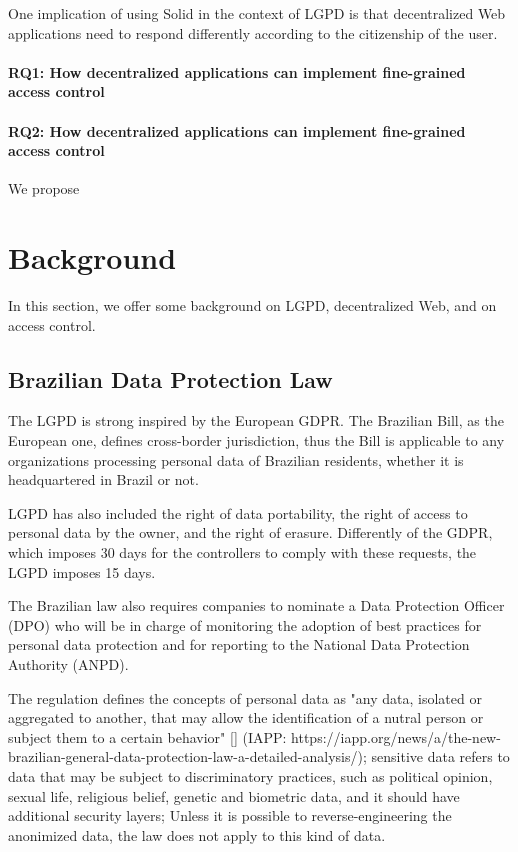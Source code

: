 \documentclass[sigconf]{acmart}
\begin{document}
One implication of using Solid in the context of LGPD is that decentralized Web applications need to respond differently according to the citizenship of the user.

\paragraph{RQ1: How decentralized applications can implement fine-grained access control}

\paragraph{RQ2: How decentralized applications can implement fine-grained access control}

We propose



\section{Background}
In this section, we offer some background on LGPD, decentralized Web, and on access control.

\subsection{Brazilian Data Protection Law}
The LGPD is strong inspired by the European GDPR. The Brazilian Bill, as the European one, defines cross-border jurisdiction, thus the Bill is applicable to any organizations processing personal data of Brazilian residents, whether it is headquartered in Brazil or not.

LGPD has also included the right of data portability, the right of access to personal data by the owner, and the right of erasure. Differently of the GDPR, which imposes 30 days for the controllers to comply with these requests, the LGPD imposes 15 days.

The Brazilian law also requires companies to nominate a Data Protection Officer (DPO) who will be in charge of monitoring the adoption of best practices for personal data protection and for reporting to the National Data Protection Authority (ANPD).

The regulation defines the concepts of personal data as "any data, isolated or aggregated to another, that may allow the identification of a nutral person or subject them to a certain behavior" [] (IAPP: https://iapp.org/news/a/the-new-brazilian-general-data-protection-law-a-detailed-analysis/); sensitive data refers to data that may be subject to discriminatory practices, such as political opinion, sexual life, religious belief, genetic and biometric data, and it should have additional security layers; Unless it is possible to reverse-engineering the anonimized data, the law does not apply to this kind of data.
\end{document}
